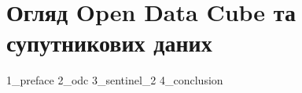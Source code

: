 \chapter{Огляд Open Data Cube та супутникових даних} %
{1_preface}
{2_odc}
{3_sentinel_2}
{4_conclusion}
